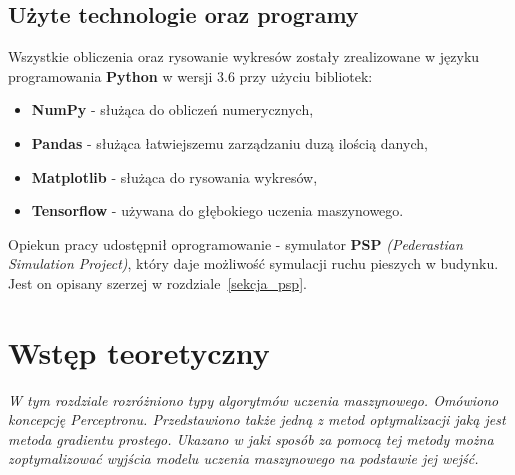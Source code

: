 \documentclass[12pt]{aghdpl}
\begin{document}
		\section{Użyte technologie oraz programy}
		Wszystkie obliczenia oraz rysowanie wykresów zostały zrealizowane w języku programowania \textbf{Python} w wersji 3.6 przy użyciu bibliotek:
		\begin{itemize}
			\item \textbf{NumPy} - służąca do obliczeń numerycznych,
			\item \textbf{Pandas} - służąca łatwiejszemu zarządzaniu duzą ilością danych,
			\item \textbf{Matplotlib} - służąca do rysowania wykresów,
			\item \textbf{Tensorflow} - używana do głębokiego uczenia maszynowego.
		\end{itemize}
		
		Opiekun pracy udostępnił oprogramowanie - symulator \textbf{PSP} \textit{(Pederastian Simulation Project)}, który daje możliwość symulacji ruchu pieszych w budynku. Jest on opisany szerzej w rozdziale~\ref{sekcja_psp}.
		
	\chapter{Wstęp teoretyczny}
	\textit{W tym rozdziale rozróżniono typy algorytmów uczenia maszynowego. Omówiono koncepcję Perceptronu. Przedstawiono także jedną z metod optymalizacji jaką jest metoda gradientu prostego. Ukazano w jaki sposób za pomocą tej metody można zoptymalizować wyjścia modelu uczenia maszynowego na podstawie jej wejść.}
	
\end{document}
